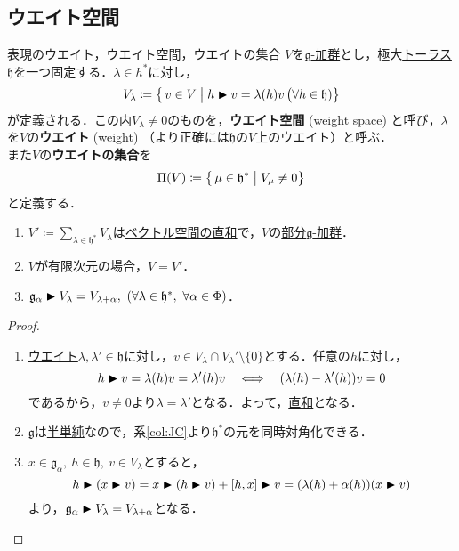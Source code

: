 \documentclass[rep_main]{subfiles}
\begin{document}
\subsection{ウエイト空間}
\begin{mydef}[label=def:weight-rep]{表現のウエイト，ウエイト空間，ウエイトの集合}
	$V$を\hyperref[ax:g-module]{$\mathfrak{g}$-加群}とし，極大\hyperref[def:toral-subLieAlg]{トーラス}$\mathfrak{h}$を一つ固定する．$\lambda \in h^*$に対し，
	\begin{align}
		V_\lambda \coloneqq \bigl\{\, v \in V \bigm| h \blacktriangleright v = \lambda(h) v \,\bigr (\forall h \in \mathfrak{h})\bigr\}
	\end{align}
	が定義される．この内$V_\lambda \neq 0$のものを，\textbf{ウエイト空間} (weight space) と呼び，$\lambda$を$V$の\textbf{ウエイト} (weight) （より正確には$\mathfrak{h}$の$V$上のウエイト）と呼ぶ．\\
	また$V$の\textbf{ウエイトの集合}を
	\begin{equation}
		\Pi(V) \coloneqq \bigl\{\, \mu \in \mathfrak{h}^* \bigm| V_\mu \neq 0\bigr\}
	\end{equation}
	と定義する．
\end{mydef}
\begin{mylem}[label=lem:weight-rep]{}
	\begin{enumerate}
		\item $V' \coloneqq \sum_{\lambda \in \mathfrak{h}^*} V_\lambda$は\hyperref[def:univ-vec-sum]{ベクトル空間の直和}で，$V$の\hyperref[def:sub-g-module]{部分$\mathfrak{g}$-加群}．
		\item $V$が有限次元の場合，$V = V'$．
		\item $\mathfrak{g}_\alpha \blacktriangleright V_\lambda = V_{\lambda + \alpha},\ (\forall \lambda \in \mathfrak{h}^*,\ \forall \alpha \in \Phi)$．
	\end{enumerate}
\end{mylem}
\begin{proof}
	\begin{enumerate}
		\item \hyperref[def:weight-rep]{ウエイト}$\lambda, \lambda' \in \mathfrak{h}$に対し，$v \in V_\lambda \cap V_\lambda' \setminus \{0\}$とする．任意の$h$に対し，
		\begin{equation}
			h \blacktriangleright v = \lambda(h)v = \lambda'(h)v  \quad \Longleftrightarrow \quad  (\lambda(h) - \lambda'(h))v = 0 
		\end{equation}
		であるから，$v \neq 0$より$\lambda = \lambda'$となる．よって，\hyperref[def:univ-vec-sum]{直和}となる．
		\item $\mathfrak{g}$は\hyperref[def:semisimple-LieAlg]{半単純}なので，系\ref{col:JC}より$\mathfrak{h}^*$の元を同時対角化できる．
		\item $x \in \mathfrak{g}_\alpha,\ h \in \mathfrak{h},\ v \in V_\lambda$とすると，
		\begin{equation}
			h \blacktriangleright (x \blacktriangleright v) = x \blacktriangleright (h \blacktriangleright v) + [h, x] \blacktriangleright v = (\lambda(h) + \alpha(h))(x \blacktriangleright v)
		\end{equation}
		より，$\mathfrak{g}_\alpha \blacktriangleright V_\lambda = V_{\lambda + \alpha}$となる．
	\end{enumerate}
\end{proof}
\end{document}
